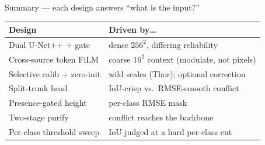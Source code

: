 \documentclass[aspectratio=169,11pt]{beamer}
\begin{document}
\begin{frame}{Summary --- each design answers ``what is the input?''}
  \small
  \begin{tabular}{ll}
    \toprule
    \textbf{Design} & \textbf{Driven by\dots}\\
    \midrule
    Dual U-Net++ + gate & dense $256^2$, differing reliability\\
    Cross-source token FiLM & coarse $16^2$ context (modulate, not pixels)\\
    Selective calib + zero-init & wild scales (Thor); optional correction\\
    Split-trunk head & IoU-crisp vs.\ RMSE-smooth conflict\\
    Presence-gated height & per-class RMSE mask\\
    Two-stage purify & conflict reaches the backbone\\
    Per-class threshold sweep & IoU judged at a hard per-class cut\\
    \bottomrule
  \end{tabular}
\end{frame}
\end{document}
